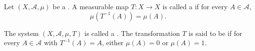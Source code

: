 \begin{definition} \label{definition:measure_preserving_transformation_on_a_probability_space}
Let $(X, \mathcal{A}, \mu)$ be a . A measurable map $T: X \to X$ is called a  if for every $A \in \mathcal{A}$,
$$\mu(T^{-1}(A)) = \mu(A).$$

The system $(X, \mathcal{A}, \mu, T)$ is called a . The transformation $T$ is said to be  if for every $A \in \mathcal{A}$ with $T^{-1}(A) = A$, either $\mu(A) = 0$ or $\mu(A) = 1$.
\end{definition}
